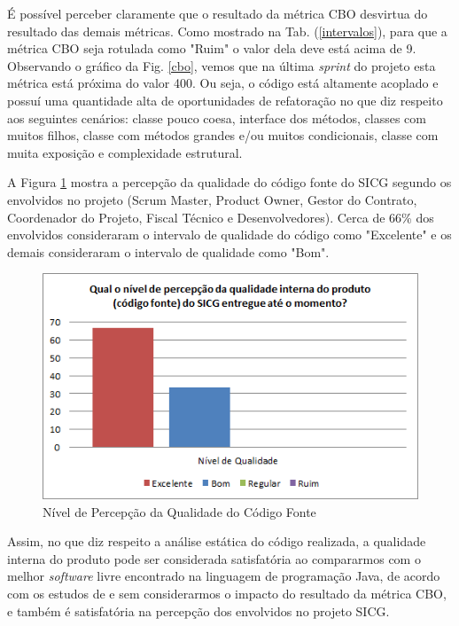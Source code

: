 É possível perceber claramente que o resultado da métrica CBO desvirtua do resultado das demais métricas. Como mostrado na Tab. (\ref{intervalos}), para que a métrica CBO seja rotulada como "Ruim" o valor dela deve está acima de 9. Observando o gráfico da Fig. \ref{cbo}, vemos que na última \textit{sprint} do projeto esta métrica está próxima do valor 400. Ou seja, o código está altamente acoplado e possuí uma quantidade alta de oportunidades de refatoração no que diz respeito aos seguintes cenários: classe pouco coesa, interface dos métodos, classes com muitos filhos, classe com métodos grandes e/ou muitos condicionais, classe com muita exposição e complexidade estrutural. 

A Figura \ref{percepcaoqualidade} mostra a percepção da qualidade do código fonte do SICG segundo os envolvidos no projeto (Scrum Master, Product Owner, Gestor do Contrato, Coordenador do Projeto, Fiscal Técnico e Desenvolvedores). Cerca de 66\% dos envolvidos consideraram  o intervalo de qualidade do código como "Excelente" e os demais consideraram
o intervalo de qualidade como "Bom".

\begin{figure}[H]
		\centering
			\includegraphics[scale=1.0]{figuras/percepcaoqualidade.png}
		\caption{Nível de Percepção da Qualidade do Código Fonte}
		\label{percepcaoqualidade}
\end{figure}

Assim, no que diz respeito a análise estática do código realizada, a qualidade interna do produto pode ser considerada satisfatória ao compararmos com o melhor \textit{software} livre encontrado na linguagem de programação Java, de acordo com os estudos de  e sem considerarmos o impacto do resultado da métrica CBO, e também é satisfatória na percepção dos envolvidos no projeto SICG. 

